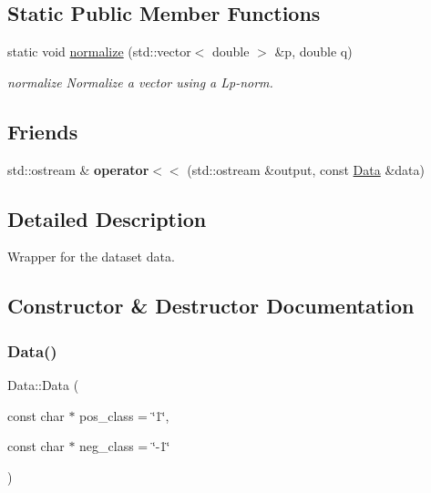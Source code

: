 \subsection*{Static Public Member Functions}
\begin{DoxyCompactItemize}
\item 
static void \hyperlink{class_data_acd8fd65a56a3d097d1bc19fb8249ee20}{normalize} (std\+::vector$<$ double $>$ \&p, double q)
\begin{DoxyCompactList}\small\item\em normalize Normalize a vector using a Lp-\/norm. \end{DoxyCompactList}\end{DoxyCompactItemize}
\subsection*{Friends}
\begin{DoxyCompactItemize}
\item 
\mbox{\label{class_data_ae7387779a206ec9f8d282b354e0c3316}} 
std\+::ostream \& {\bfseries operator$<$$<$} (std\+::ostream \&output, const \hyperlink{class_data}{Data} \&data)
\end{DoxyCompactItemize}


\subsection{Detailed Description}
Wrapper for the dataset data. 

\subsection{Constructor \& Destructor Documentation}
\mbox{\label{class_data_aa3ca35c963eec5a4734df23f88443077}} 
\subsubsection{\texorpdfstring{Data()}{Data()}\hspace{0.1cm}{\footnotesize\ttfamily [1/2]}}
{\footnotesize\ttfamily Data\+::\+Data (\begin{DoxyParamCaption}\item[{const char $\ast$}]{pos\+\_\+class = {\ttfamily \char`\"{}1\char`\"{}},  }\item[{const char $\ast$}]{neg\+\_\+class = {\ttfamily \char`\"{}-\/1\char`\"{}} }\end{DoxyParamCaption})}



